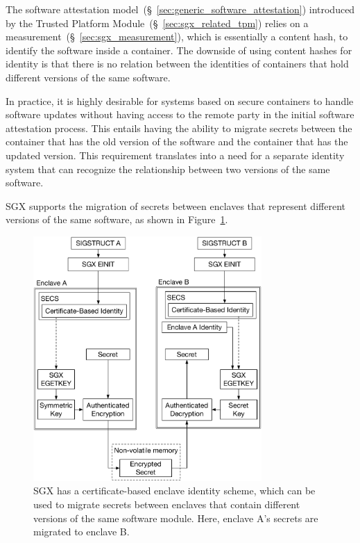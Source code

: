 \label{sec:sgx_versioning}

The software attestation model~(\S~\ref{sec:generic_software_attestation})
introduced by the Trusted Platform Module~(\S~\ref{sec:sgx_related_tpm}) relies
on a measurement~(\S~\ref{sec:sgx_measurement}), which is essentially a content
hash, to identify the software inside a container. The downside of using
content hashes for identity is that there is no relation between the identities
of containers that hold different versions of the same software.

In practice, it is highly desirable for systems based on secure containers to
handle software updates without having access to the remote party in the initial
software attestation process. This entails having the ability to migrate secrets
between the container that has the old version of the software and the container
that has the updated version. This requirement translates into a need for a
separate identity system that can recognize the relationship between two versions
of the same software.

SGX supports the migration of secrets between enclaves that represent different
versions of the same software, as shown in
Figure~\ref{fig:sgx_secret_migration}.

\begin{figure}[hbt]
  \centering
  \includegraphics[width=87mm]{figures/sgx_secret_migration.pdf}
  \caption{
    SGX has a certificate-based enclave identity scheme, which can be used to
    migrate secrets between enclaves that contain different versions of the
    same software module. Here, enclave A's secrets are migrated to enclave B.
  }
  \label{fig:sgx_secret_migration}
\end{figure}

